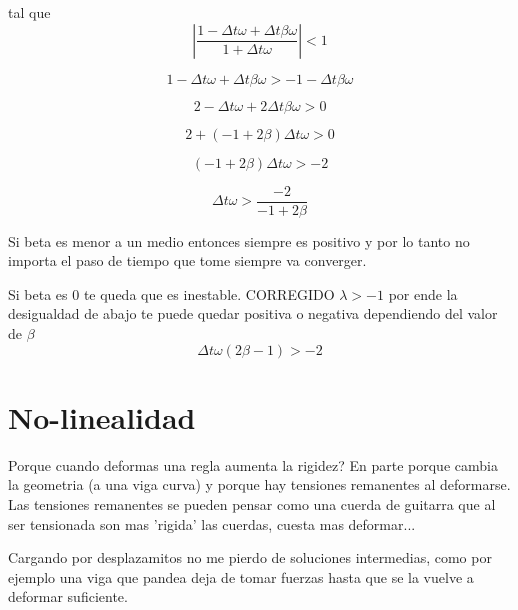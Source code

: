 \documentclass[11pt, a4paper,titlepage]{article}
\newcommand{\feaQP}{null.tex}
\newcommand{\annexFile}{null.tex}
\begin{document}
tal que 
\[
\left| \frac{1-\Delta t \omega + \Delta t \beta \omega}{1+\Delta t \omega} \right| <1
\]

\[
1-\Delta t \omega + \Delta t \beta \omega > -1 - \Delta t \beta \omega
\]

\[
2-\Delta t \omega + 2 \Delta t \beta \omega > 0
\]

\[
2+(-1+2 \beta ) \Delta t \omega > 0
\]

\[
(-1 + 2\beta ) \Delta t \omega > -2 
\]

\[
\Delta t \omega > \frac{-2}{-1 + 2\beta}
\]

Si beta es menor a un medio entonces siempre es positivo y por lo tanto no importa el paso de tiempo que tome siempre va converger.



Si beta es 0 te queda que es inestable.
CORREGIDO
$\lambda > -1$ por ende la desigualdad de abajo te puede quedar positiva o negativa dependiendo del valor de $\beta $
\[
\Delta t \omega(2\beta -1) > -2
\]

\section{No-linealidad}

Porque cuando deformas una regla aumenta la rigidez? En parte porque cambia la geometria (a una viga curva) y porque hay tensiones remanentes al deformarse. Las tensiones remanentes se pueden pensar como una cuerda de guitarra que al ser tensionada son mas 'rigida' las cuerdas, cuesta mas deformar...

Cargando por desplazamitos no me pierdo de soluciones intermedias, como por ejemplo una viga que pandea deja de tomar fuerzas hasta que se la vuelve a deformar suficiente.



\end{document}
